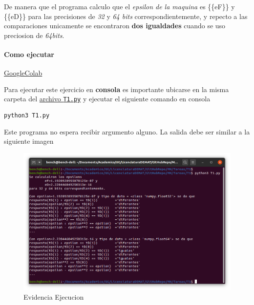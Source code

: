 \documentclass[11pt]{article}
\begin{document}
    De manera que el programa calculo que el \emph{epsilon de la maquina} es
\{\{eF\}\} y \{\{eD\}\} para las precisiones de \emph{32} y \emph{64
bits} correspondientemente, y repecto a las comparaciones unicamente se
encontraron \textbf{dos igualdades} cuando se uso preciosion de
\emph{64bits}.

    \hypertarget{como-ejecutar}{%
\paragraph{Como ejecutar}\label{como-ejecutar}}

    \href{https://colab.research.google.com/gist/BenchHPZ/cd5bc176f3e3841fa1e84924feca9ec2/tarea1-benjamin_rivera-metodos_numericos.ipynb}{GoogleColab}

Para ejecutar este ejercicio en \textbf{consola} es importante ubicarse
en la misma carpeta del
\href{https://github.com/BenchHPZ/UG-Compu/blob/master/MN/Tareas/T1/T1.py}{archivo
\texttt{T1.py}} y ejecutar el siguiente comando en consola

\begin{verbatim}
python3 T1.py
\end{verbatim}

Este programa no espera recibir argumento alguno. La salida debe ser
similar a la siguiente imagen

\begin{figure}
	\centering
	\includegraphics[scale=1.1]{assets/E2-1.png}
	\caption{Evidencia Ejecucion}
\end{figure}


    
    
    
\end{document}
